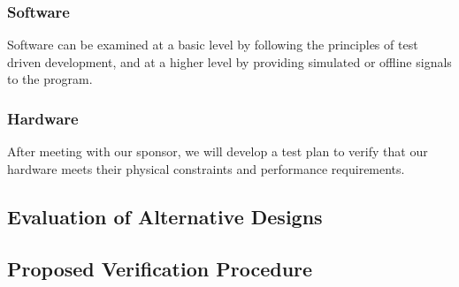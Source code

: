 \subsubsection{\label{sec:method:proposed-analysis:software}Software}
Software can be examined at a basic level by following the principles of test driven development, and at a higher level by providing simulated or offline signals to the program.

\subsubsection{\label{sec:method:proposed-analysis:hardware}Hardware}
After meeting with our sponsor, we will develop a test plan to verify that our hardware meets their physical constraints and performance requirements.

\subsection{\label{sec:method:evaluation-of-alternative-designs}Evaluation of Alternative Designs}

\subsection{\label{sec:method:proposed-verification-procedure}Proposed Verification Procedure}